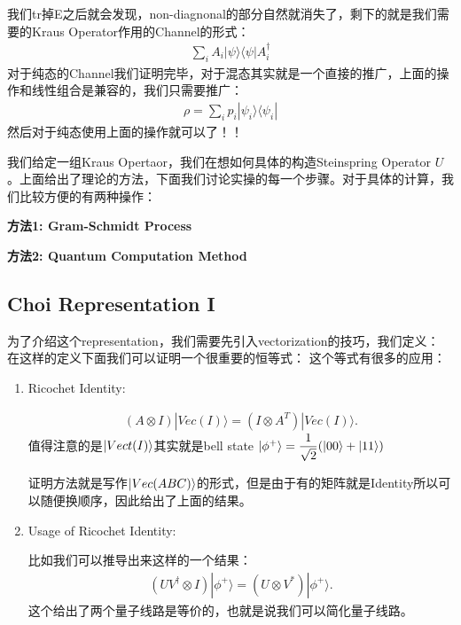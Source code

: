 我们tr掉E之后就会发现，non-diagnonal的部分自然就消失了，剩下的就是我们需要的Kraus Operator作用的Channel的形式：
\begin{align}
  \sum_iA_i|\psi\rangle\langle\psi|A_i^\dagger
\end{align}
对于纯态的Channel我们证明完毕，对于混态其实就是一个直接的推广，上面的操作和线性组合是兼容的，我们只需要推广：
\begin{align}
  \rho=\sum_ip_i|\psi_i\rangle\langle\psi_i|
\end{align}
然后对于纯态使用上面的操作就可以了！！
\line


我们给定一组Kraus Opertaor，我们在想如何具体的构造Steinspring Operator $ U $。上面给出了理论的方法，下面我们讨论实操的每一个步骤。对于具体的计算，我们比较方便的有两种操作：

\textbf{方法1: Gram-Schmidt Process}


\textbf{方法2: Quantum Computation Method}





\subsection{Choi Representation I}



为了介绍这个representation，我们需要先引入vectorization的技巧，我们定义：
在这样的定义下面我们可以证明一个很重要的恒等式：
这个等式有很多的应用：
\begin{enumerate}
  \item Ricochet Identity:

\begin{align}
  (A\otimes I)|Vec(I)\rangle=(I\otimes A^T)|Vec(I)\rangle.
\end{align}
值得注意的是$ \left| Vect(I) \right\rangle $其实就是bell state $ \left| \phi^+ \right\rangle  = \displaystyle\frac{1}{\sqrt{2}} ( \left| 00 \right\rangle + \left| 11 \right\rangle ) $

证明方法就是写作$ \left| Vec(ABC) \right\rangle $的形式，但是由于有的矩阵就是Identity所以可以随便换顺序，因此给出了上面的结果。
  \item Usage of Ricochet Identity:

    比如我们可以推导出来这样的一个结果：
    \begin{align}
      \left(UV^{\dagger}\otimes I\right)|\phi^{+}\rangle=(U\otimes V^{*})|\phi^{+}\rangle.
    \end{align}
    这个给出了两个量子线路是等价的，也就是说我们可以简化量子线路。
\end{enumerate}


